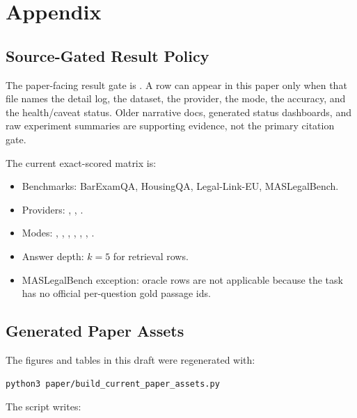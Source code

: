 \section{Appendix}\label{sec:appendix}

\subsection{Source-Gated Result Policy}

The paper-facing result gate is \claimgate. A row can appear in this paper only
when that file names the detail log, the dataset, the provider, the mode, the
accuracy, and the health/caveat status. Older narrative docs, generated status
dashboards, and raw experiment summaries are supporting evidence, not the
primary citation gate.

The current exact-scored matrix is:

\begin{itemize}[leftmargin=*]
\item Benchmarks: BarExamQA, HousingQA, Legal-Link-EU, MASLegalBench.
\item Providers: , ,
.
\item Modes: , , ,
, , ,
.
\item Answer depth: $k=5$ for retrieval rows.
\item MASLegalBench exception: oracle rows are not applicable because the task
has no official per-question gold passage ids.
\end{itemize}

\subsection{Generated Paper Assets}

The figures and tables in this draft were regenerated with:

\begin{verbatim}
python3 paper/build_current_paper_assets.py
\end{verbatim}

The script writes:


